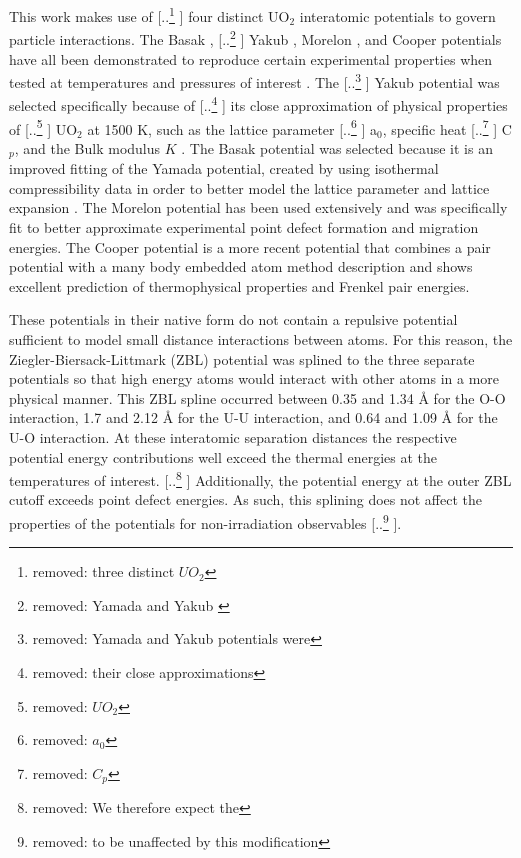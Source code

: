 \documentclass[review]{elsarticle} %
\providecommand{\DIFaddtex}[1]{{\protect\color{blue} \sf #1}} %
\providecommand{\DIFdeltex}[1]{{\protect\color{red} [..\footnote{removed: #1} ]}} %
\providecommand{\DIFaddbegin}{} %
\providecommand{\DIFaddend}{} %
\providecommand{\DIFdelbegin}{} %
\providecommand{\DIFdelend}{} %
\providecommand{\DIFadd}[1]{\texorpdfstring{\DIFaddtex{#1}}{#1}} %
\providecommand{\DIFdel}[1]{\texorpdfstring{\DIFdeltex{#1}}{}} %
\newcommand{\DIFscaledelfig}{0.5}
\newlength{\DIFdelgraphicswidth} %
\newlength{\DIFdelgraphicsheight} %
\newcommand{\DIFaddincludegraphics}[2][]{{\color{blue}\fbox{\DIFOincludegraphics[#1]{#2}}}} %
\newcommand{\DIFdelincludegraphics}[2][]{%
\sbox{\DIFdelgraphicsbox}{\DIFOincludegraphics[#1]{#2}}%
\settoboxwidth{\DIFdelgraphicswidth}{\DIFdelgraphicsbox} %
\settoboxtotalheight{\DIFdelgraphicsheight}{\DIFdelgraphicsbox} %
\scalebox{\DIFscaledelfig}{%
\parbox[b]{\DIFdelgraphicswidth}{\usebox{\DIFdelgraphicsbox}\\[-\baselineskip] \rule{\DIFdelgraphicswidth}{0em}}\llap{\resizebox{\DIFdelgraphicswidth}{\DIFdelgraphicsheight}{%
\setlength{\unitlength}{\DIFdelgraphicswidth}%
\begin{picture}(1,1)%
\thicklines\linethickness{2pt} %
{\color[rgb]{1,0,0}\put(0,0){\framebox(1,1){}}}%
{\color[rgb]{1,0,0}\put(0,0){\line( 1,1){1}}}%
{\color[rgb]{1,0,0}\put(0,1){\line(1,-1){1}}}%
\end{picture}%
}\hspace*{3pt}}} %
} %
\DeclareRobustCommand{\DIFaddbegin}{\DIFOaddbegin \let\includegraphics\DIFaddincludegraphics} %
\DeclareRobustCommand{\DIFaddend}{\DIFOaddend \let\includegraphics\DIFOincludegraphics} %
\DeclareRobustCommand{\DIFdelbegin}{\DIFOdelbegin \let\includegraphics\DIFdelincludegraphics} %
\DeclareRobustCommand{\DIFdelend}{\DIFOaddend \let\includegraphics\DIFOincludegraphics} %
\begin{document}
This work makes use of \DIFdelbegin \DIFdel{three distinct $UO_2$ }\DIFdelend \DIFaddbegin \DIFadd{four distinct UO$_2$ }\DIFaddend interatomic potentials to govern particle interactions. The Basak \cite{basak}, \DIFdelbegin \DIFdel{Yamada\cite{yamada} and Yakub \cite{yakub}}\DIFdelend \DIFaddbegin \DIFadd{Yakub \cite{yakub}, Morelon \cite{morelon2003}, and Cooper \cite{cooper} }\DIFaddend potentials have all been demonstrated to reproduce certain experimental properties when tested at temperatures and pressures of interest \cite{govers1,govers2,potashnikov}. The \DIFdelbegin \DIFdel{Yamada and Yakub potentials were }\DIFdelend \DIFaddbegin \DIFadd{Yakub potential was }\DIFaddend selected specifically because of \DIFdelbegin \DIFdel{their close approximations }\DIFdelend \DIFaddbegin \DIFadd{its close approximation }\DIFaddend of physical properties of \DIFdelbegin \DIFdel{$UO_2$ }\DIFdelend \DIFaddbegin \DIFadd{UO$_2$ }\DIFaddend at 1500 K, such as the lattice parameter \DIFdelbegin \DIFdel{$a_0$}\DIFdelend \DIFaddbegin \DIFadd{a$_0$}\DIFaddend , specific heat \DIFdelbegin \DIFdel{$C_p$}\DIFdelend \DIFaddbegin \DIFadd{C$_p$}\DIFaddend , and the Bulk modulus $K$ \cite{govers2}. The Basak potential was selected because it is an improved fitting of the Yamada potential, created by using isothermal compressibility data in order to better model the lattice parameter and lattice expansion \cite{basak}. \DIFaddbegin \DIFadd{The Morelon potential has been used extensively and was specifically fit to better approximate experimental point defect formation and migration energies. The Cooper potential is a more recent potential that combines a pair potential with a many body embedded atom method description and shows excellent prediction of thermophysical properties and Frenkel pair energies.
}\DIFaddend 

These potentials in their native form do not contain a repulsive potential sufficient to model small distance interactions between atoms. For this reason, the Ziegler-Biersack-Littmark (ZBL) \cite{ZBL} potential was splined to the three separate potentials so that high energy atoms would interact with other atoms in a more physical manner. This ZBL spline occurred between 0.35 and 1.34 {\AA} for the O-O interaction, 1.7 and 2.12 {\AA} for the U-U interaction, and 0.64 and 1.09 {\AA} for the U-O interaction. At these interatomic separation distances the respective potential energy contributions well exceed the thermal energies at the temperatures of interest. \DIFdelbegin \DIFdel{We therefore expect the }\DIFdelend \DIFaddbegin \DIFadd{Additionally, the potential energy at the outer ZBL cutoff exceeds point defect energies. As such, this splining does not affect the }\DIFaddend properties of the potentials for non-irradiation observables\DIFdelbegin \DIFdel{to be unaffected by this modification}\DIFdelend .
\end{document}
